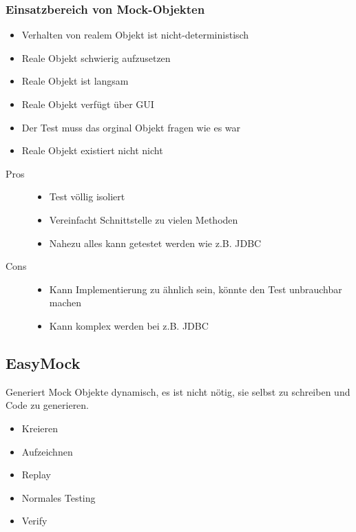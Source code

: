 \documentclass[a4paper,10pt]{article}
\begin{document}
\subsubsection{Einsatzbereich von Mock-Objekten}
\begin{itemize}
	\item Verhalten von realem Objekt ist nicht-deterministisch
	\item Reale Objekt schwierig aufzusetzen
	\item Reale Objekt ist langsam
	\item Reale Objekt verf\"{u}gt \"{u}ber GUI
	\item Der Test muss das orginal Objekt fragen wie es war
	\item Reale Objekt existiert nicht nicht
\end{itemize}
\begin{description}
	\item[Pros] \hfill
		\begin{itemize}
			\item Test v\"{o}llig isoliert
			\item Vereinfacht Schnittstelle zu vielen Methoden
			\item Nahezu alles kann getestet werden wie z.B. JDBC
		\end{itemize}
	\item[Cons] \hfill
		\begin{itemize}
			\item Kann Implementierung zu \"{a}hnlich sein, k\"{o}nnte den Test unbrauchbar machen
			\item Kann komplex werden bei z.B. JDBC
		\end{itemize}
\end{description}

\subsection{EasyMock}

Generiert Mock Objekte dynamisch, es ist nicht n\"{o}tig, sie selbst zu schreiben und Code zu generieren.
\begin{itemize}
\item Kreieren
\item Aufzeichnen
\item Replay
\item Normales Testing
\item Verify
\end{itemize}
\end{document}
